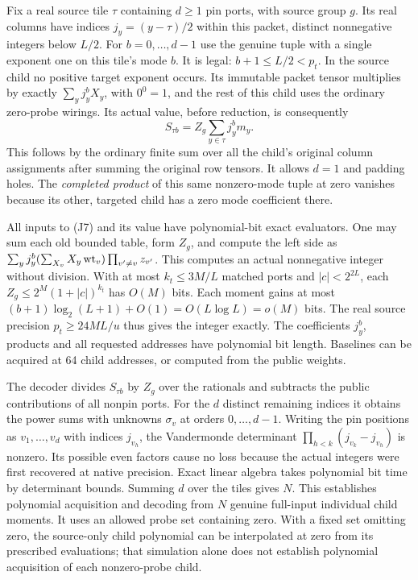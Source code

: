 \documentclass[11pt,a4paper]{article}
\begin{document}
Fix a real source tile \(\tau\) containing \(d\ge1\) pin ports, with
source group \(g\). Its real columns have indices \(j_y=(y-\tau)/2\)
within this packet, distinct nonnegative integers below \(L/2\). For
\(b=0,\ldots,d-1\) use the genuine tuple with a single exponent one on
this tile's mode \(b\). It is legal: \(b+1\le L/2<p_t\). In the source
child no positive target exponent occurs. Its immutable packet tensor
multiplies by exactly \(\sum_y j_y^bX_y\), with \(0^0=1\), and the rest
of this child uses the ordinary zero-probe wirings. Its actual value,
before reduction, is consequently \[
                    S_{\tau b}=Z_g\sum_{y\in\tau} j_y^b m_y .              \tag{J7}
\] This follows by the ordinary finite sum over all the child's original
column assignments after summing the original row tensors. It allows
\(d=1\) and padding holes. The \emph{completed product} of this same
nonzero-mode tuple at zero vanishes because its other, targeted child
has a zero mode coefficient there.

All inputs to (J7) and its value have polynomial-bit exact evaluators.
One may sum each old bounded table, form \(Z_g\), and compute the left
side as
\(\sum_y j_y^b(\sum_{X_v} X_y\,{\rm wt}_v)\prod_{v'\ne v}z_{v'}\). This
computes an actual nonnegative integer without division. With at most
\(k_t\le3M/L\) matched ports and \(|c|<2^{2L}\), each
\(Z_g\le2^M(1+|c|)^{k_t}\) has \(O(M)\) bits. Each moment gains at most
\((b+1)\log_2(L+1)+O(1)=O(L\log L)=o(M)\) bits. The real source
precision \(p_t\ge24ML/u\) thus gives the integer exactly. The
coefficients \(j_y^b\), products and all requested addresses have
polynomial bit length. Baselines can be acquired at 64 child addresses,
or computed from the public weights.

The decoder divides \(S_{\tau b}\) by \(Z_g\) over the rationals and
subtracts the public contributions of all nonpin ports. For the \(d\)
distinct remaining indices it obtains the power sums with unknowns
\(\sigma_v\) at orders \(0,\ldots,d-1\). Writing the pin positions as
\(v_1,\ldots,v_d\) with indices \(j_{v_h}\), the Vandermonde determinant
\(\prod_{h<k}(j_{v_k}-j_{v_h})\) is nonzero. Its possible even factors
cause no loss because the actual integers were first recovered at native
precision. Exact linear algebra takes polynomial bit time by determinant
bounds. Summing \(d\) over the tiles gives \(N\). This establishes
polynomial acquisition and decoding from \(N\) genuine full-input
individual child moments. It uses an allowed probe set containing zero.
With a fixed set omitting zero, the source-only child polynomial can be
interpolated at zero from its prescribed evaluations; that simulation
alone does not establish polynomial acquisition of each nonzero-probe
child.
\end{document}
